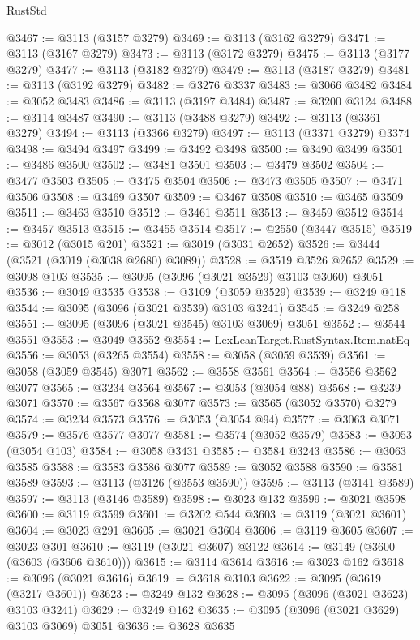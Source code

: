 \begin{lexlean}{RustStd}
\begin{coremodule}
{\begin{coremodule}
{{{{{{{{{{{{{{{{{{{{{{{{{{{{{{{{@3467 := @3113 (@3157 @3279)
@3469 := @3113 (@3162 @3279)
@3471 := @3113 (@3167 @3279)
@3473 := @3113 (@3172 @3279)
@3475 := @3113 (@3177 @3279)
@3477 := @3113 (@3182 @3279)
@3479 := @3113 (@3187 @3279)
@3481 := @3113 (@3192 @3279)
@3482 := @3276 @3337
@3483 := @3066 @3482
@3484 := @3052 @3483
@3486 := @3113 (@3197 @3484)
@3487 := @3200 @3124
@3488 := @3114 @3487
@3490 := @3113 (@3488 @3279)
@3492 := @3113 (@3361 @3279)
@3494 := @3113 (@3366 @3279)
@3497 := @3113 (@3371 @3279) @3374
@3498 := @3494 @3497
@3499 := @3492 @3498
@3500 := @3490 @3499
@3501 := @3486 @3500
@3502 := @3481 @3501
@3503 := @3479 @3502
@3504 := @3477 @3503
@3505 := @3475 @3504
@3506 := @3473 @3505
@3507 := @3471 @3506
@3508 := @3469 @3507
@3509 := @3467 @3508
@3510 := @3465 @3509
@3511 := @3463 @3510
@3512 := @3461 @3511
@3513 := @3459 @3512
@3514 := @3457 @3513
@3515 := @3455 @3514
@3517 := @2550 (@3447 @3515)
@3519 := @3012 (@3015 @201)
@3521 := @3019 (@3031 @2652)
@3526 := @3444 (@3521 (@3019 (@3038 @2680) @3089))
@3528 := @3519 @3526 @2652
@3529 := @3098 @103
@3535 := @3095 (@3096 (@3021 @3529) @3103 @3060) @3051
@3536 := @3049 @3535
@3538 := @3109 (@3059 @3529)
@3539 := @3249 @118
@3544 := @3095 (@3096 (@3021 @3539) @3103 @3241)
@3545 := @3249 @258
@3551 := @3095 (@3096 (@3021 @3545) @3103 @3069) @3051
@3552 := @3544 @3551
@3553 := @3049 @3552
@3554 := LexLeanTarget.RustSyntax.Item.natEq
@3556 := @3053 (@3265 @3554)
@3558 := @3058 (@3059 @3539)
@3561 := @3058 (@3059 @3545) @3071
@3562 := @3558 @3561
@3564 := @3556 @3562 @3077
@3565 := @3234 @3564
@3567 := @3053 (@3054 @88)
@3568 := @3239 @3071
@3570 := @3567 @3568 @3077
@3573 := @3565 (@3052 @3570) @3279
@3574 := @3234 @3573
@3576 := @3053 (@3054 @94)
@3577 := @3063 @3071
@3579 := @3576 @3577 @3077
@3581 := @3574 (@3052 @3579)
@3583 := @3053 (@3054 @103)
@3584 := @3058 @3431
@3585 := @3584 @3243
@3586 := @3063 @3585
@3588 := @3583 @3586 @3077
@3589 := @3052 @3588
@3590 := @3581 @3589
@3593 := @3113 (@3126 (@3553 @3590))
@3595 := @3113 (@3141 @3589)
@3597 := @3113 (@3146 @3589)
@3598 := @3023 @132
@3599 := @3021 @3598
@3600 := @3119 @3599
@3601 := @3202 @544
@3603 := @3119 (@3021 @3601)
@3604 := @3023 @291
@3605 := @3021 @3604
@3606 := @3119 @3605
@3607 := @3023 @301
@3610 := @3119 (@3021 @3607) @3122
@3614 := @3149 (@3600 (@3603 (@3606 @3610)))
@3615 := @3114 @3614
@3616 := @3023 @162
@3618 := @3096 (@3021 @3616)
@3619 := @3618 @3103
@3622 := @3095 (@3619 (@3217 @3601))
@3623 := @3249 @132
@3628 := @3095 (@3096 (@3021 @3623) @3103 @3241)
@3629 := @3249 @162
@3635 := @3095 (@3096 (@3021 @3629) @3103 @3069) @3051
@3636 := @3628 @3635
}}}}}}}}}}}}}}}}}}}}}}}}}}}}}}}}
\end{coremodule}}
\end{coremodule}
\end{lexlean}

